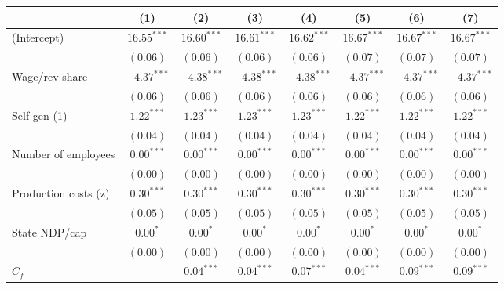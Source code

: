 
\begin{tabular}{l c c c c c c c }
\toprule
 & (1) & (2) & (3) & (4) & (5) & (6) & (7) \\
\midrule
(Intercept)                      & $16.55^{***}$ & $16.60^{***}$ & $16.61^{***}$ & $16.62^{***}$ & $16.67^{***}$ & $16.67^{***}$ & $16.67^{***}$ \\
                                 & $(0.06)$      & $(0.06)$      & $(0.06)$      & $(0.06)$      & $(0.07)$      & $(0.07)$      & $(0.07)$      \\
Wage/rev share                   & $-4.37^{***}$ & $-4.38^{***}$ & $-4.38^{***}$ & $-4.38^{***}$ & $-4.37^{***}$ & $-4.37^{***}$ & $-4.37^{***}$ \\
                                 & $(0.06)$      & $(0.06)$      & $(0.06)$      & $(0.06)$      & $(0.06)$      & $(0.06)$      & $(0.06)$      \\
Self-gen (1)                     & $1.22^{***}$  & $1.23^{***}$  & $1.23^{***}$  & $1.23^{***}$  & $1.22^{***}$  & $1.22^{***}$  & $1.22^{***}$  \\
                                 & $(0.04)$      & $(0.04)$      & $(0.04)$      & $(0.04)$      & $(0.04)$      & $(0.04)$      & $(0.04)$      \\
Number of employees              & $0.00^{***}$  & $0.00^{***}$  & $0.00^{***}$  & $0.00^{***}$  & $0.00^{***}$  & $0.00^{***}$  & $0.00^{***}$  \\
                                 & $(0.00)$      & $(0.00)$      & $(0.00)$      & $(0.00)$      & $(0.00)$      & $(0.00)$      & $(0.00)$      \\
Production costs (z)             & $0.30^{***}$  & $0.30^{***}$  & $0.30^{***}$  & $0.30^{***}$  & $0.30^{***}$  & $0.30^{***}$  & $0.30^{***}$  \\
                                 & $(0.05)$      & $(0.05)$      & $(0.05)$      & $(0.05)$      & $(0.05)$      & $(0.05)$      & $(0.05)$      \\
State NDP/cap                    & $0.00^{*}$    & $0.00^{*}$    & $0.00^{*}$    & $0.00^{*}$    & $0.00^{*}$    & $0.00^{*}$    & $0.00^{*}$    \\
                                 & $(0.00)$      & $(0.00)$      & $(0.00)$      & $(0.00)$      & $(0.00)$      & $(0.00)$      & $(0.00)$      \\
$C_{f}$                          &               & $0.04^{***}$  & $0.04^{***}$  & $0.07^{***}$  & $0.04^{***}$  & $0.09^{***}$  & $0.09^{***}$  \\

\end{tabular}
